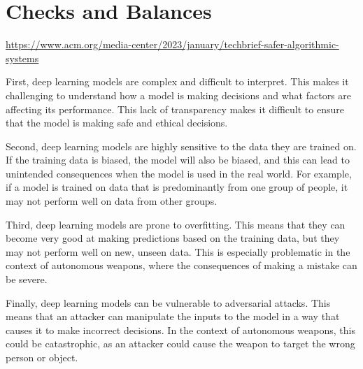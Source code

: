 \section{Checks and Balances}

\url{https://www.acm.org/media-center/2023/january/techbrief-safer-algorithmic-systems}

First, deep learning models are complex and difficult to interpret. This makes it challenging to understand how a model is making decisions and what factors are affecting its performance. This lack of transparency makes it difficult to ensure that the model is making safe and ethical decisions.

Second, deep learning models are highly sensitive to the data they are trained on. If the training data is biased, the model will also be biased, and this can lead to unintended consequences when the model is used in the real world. For example, if a model is trained on data that is predominantly from one group of people, it may not perform well on data from other groups.

Third, deep learning models are prone to overfitting. This means that they can become very good at making predictions based on the training data, but they may not perform well on new, unseen data. This is especially problematic in the context of autonomous weapons, where the consequences of making a mistake can be severe.

Finally, deep learning models can be vulnerable to adversarial attacks. This means that an attacker can manipulate the inputs to the model in a way that causes it to make incorrect decisions. In the context of autonomous weapons, this could be catastrophic, as an attacker could cause the weapon to target the wrong person or object.
